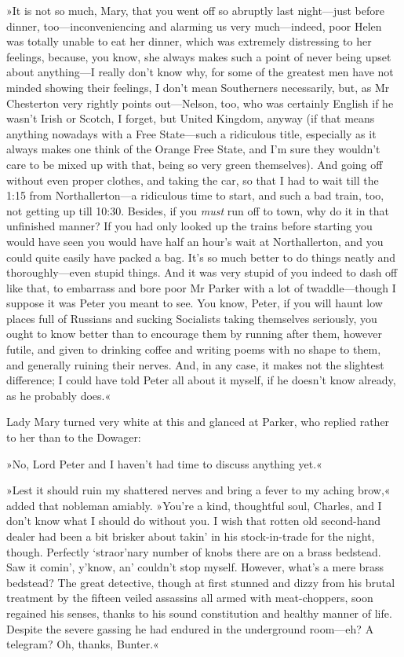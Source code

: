 »It is not so much, Mary, that you went off so abruptly last night—just before dinner, too—inconveniencing and alarming us very much—indeed, poor Helen was totally unable to eat her dinner, which was extremely distressing to her feelings, because, you know, she always makes such a point of never being upset about anything—I really don't know why, for some of the greatest men have not minded showing their feelings, I don't mean Southerners necessarily, but, as Mr  Chesterton very rightly points out—Nelson, too, who was certainly English if he wasn't Irish or Scotch, I forget, but United Kingdom, anyway (if that means anything nowadays with a Free State—such a ridiculous title, especially as it always makes one think of the Orange Free State, and I'm sure they wouldn't care to be mixed up with that, being so very green themselves). And going off without even proper clothes, and taking the car, so that I had to wait till the 1:15 from Northallerton—a ridiculous time to start, and such a bad train, too, not getting up till 10:30. Besides, if you \textit{must} run off to town, why do it in that unfinished manner? If you had only looked up the trains before starting you would have seen you would have half an hour's wait at Northallerton, and you could quite easily have packed a bag.  It's so much better to do things neatly and thoroughly—even stupid things. And it was very stupid of you indeed to dash off like that, to embarrass and bore poor Mr Parker with a lot of twaddle—though I suppose it was Peter you meant to see. You know, Peter, if you will haunt low places full of Russians and sucking Socialists taking themselves seriously, you ought to know better than to encourage them by running after them, however futile, and given to drinking coffee and writing poems with no shape to them, and generally ruining their nerves. And, in any case, it makes not the slightest difference; I could have told Peter all about it myself, if he doesn't know already, as he probably does.«

Lady Mary turned very white at this and glanced at Parker, who replied rather to her than to the Dowager:

»No, Lord Peter and I haven't had time to discuss anything yet.«

»Lest it should ruin my shattered nerves and bring a fever to my aching brow,« added that nobleman amiably. »You're a kind, thoughtful soul, Charles, and I don't know what I should do without you. I wish that rotten old second-hand dealer had been a bit brisker about takin' in his stock-in-trade for the night, though. Perfectly `straor'nary number of knobs there are on a brass bedstead. Saw it comin', y'know, an' couldn't stop myself. However, what's a mere brass bedstead? The great detective, though at first stunned and dizzy from his brutal treatment by the fifteen veiled assassins all armed with meat-choppers, soon regained his senses, thanks to his sound constitution and healthy manner of life. Despite the severe gassing he had endured in the underground room—eh? A telegram? Oh, thanks, Bunter.«

